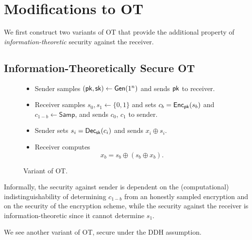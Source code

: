 \section{Modifications to OT}

We first construct two variants of OT that provide the additional property of \textit{information-theoretic} security against the receiver.

\subsection{Information-Theoretically Secure OT}

\begin{figure}[h]
	\begin{mdframed}[
		linecolor=black,
		linewidth=1pt,
		roundcorner=5pt,
		backgroundcolor=white,
		userdefinedwidth=\textwidth,
		]
		\vspace{2mm}
		\begin{itemize}
			\item Sender samples $(\mathsf{pk},\mathsf{sk})\gets\mathsf{Gen}(1^n)$ and sends $\mathsf{pk}$ to receiver.
			\item Receiver samples $s_0, s_1\gets\{0,1\}$ and sets $c_b = \mathsf{Enc}_{\mathsf{pk}}(s_b)$ and $c_{1-b}\gets\mathsf{Samp}$, and sends $c_0$, $c_1$ to sender.
			\item Sender sets $s_i=\mathsf{Dec}_{\mathsf{sk}}(c_i)$ and sends $x_i\oplus s_i$.
			\item Receiver computes
			$$x_b=s_b\oplus (s_b\oplus x_b).$$
		\end{itemize}
		\vspace{2mm}
	\end{mdframed}
	\caption{Variant of OT.}
	\label{fig:VOTPLUS}
\end{figure}

Informally, the security against sender is dependent on the (computational) indistinguishability of determining $c_{1-b}$ from an honestly sampled encryption and on the security of the encryption scheme, while the security against the receiver is information-theoretic since it cannot determine $s_1$. 

We see another variant of OT, secure under the DDH assumption.

